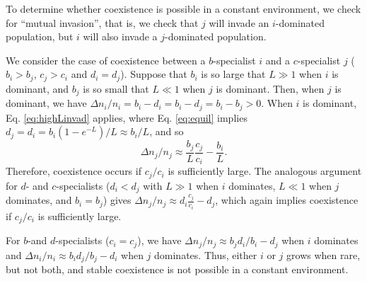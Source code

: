 \documentclass[11pt]{article}
\begin{document}
To determine whether coexistence is possible in a constant environment, we check for ``mutual invasion'', that is, we check that $j$ will invade an $i$-dominated population, but $i$ will also invade a $j$-dominated population. 

We consider the case of coexistence between a $b$-specialist $i$ and a $c$-specialist $j$ ($b_i>b_j$, $c_j>c_i$ and $d_i=d_j$). Suppose that $b_i$ is so large that $L\gg 1$ when $i$ is dominant, and $b_j$ is so small that $L\ll 1$ when $j$ is dominant. Then, when $j$ is dominant, we have $\Delta n_i/n_i=b_i-d_i=b_i-d_j=b_i-b_j>0$. When $i$ is dominant, Eq.  \eqref{eq:highLinvad} applies, where Eq. \eqref{eq:equil} implies $d_j=d_i=b_i(1-e^{-L})/L\approx b_i/L$, and so
\begin{equation}
\Delta n_j/n_j \approx \frac{b_j}{L}\frac{c_j}{c_i}-\frac{b_i}{L}.
\end{equation}
Therefore, coexistence occurs if $c_j/c_i$ is sufficiently large. The analogous argument for $d$- and $c$-specialists ($d_i<d_j$ with $L\gg 1$ when $i$ dominates, $L\ll 1$ when $j$ dominates, and $b_i=b_j$) gives $\Delta n_j/n_j \approx d_i\frac{c_j}{c_i}-d_j$, which again implies coexistence if $c_j/c_i$ is sufficiently large.

For $b$-and $d$-specialists ($c_i=c_j$), we have $\Delta n_j/n_j\approx b_j d_i/b_i-d_j$ when $i$ dominates and $\Delta n_i/n_i\approx b_i d_j/b_j-d_i$ when $j$ dominates. Thus, either $i$ or $j$ grows when rare, but not both, and stable coexistence is not possible in a constant environment.
\end{document}
